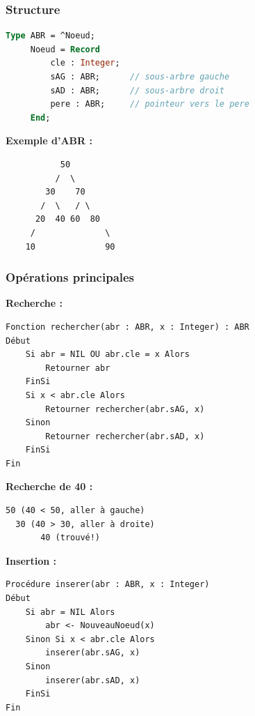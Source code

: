 \documentclass[12pt,a4paper]{article}
\begin{document}
\subsubsection{Structure}

\begin{lstlisting}[language=Pascal]
Type ABR = ^Noeud;
     Noeud = Record
         cle : Integer;
         sAG : ABR;      // sous-arbre gauche
         sAD : ABR;      // sous-arbre droit
         pere : ABR;     // pointeur vers le pere
     End;
\end{lstlisting}

\begin{exemple}
\textbf{Exemple d'ABR :}
\begin{verbatim}
           50
          /  \
        30    70
       /  \   / \
      20  40 60  80
     /              \
    10              90
\end{verbatim}
\end{exemple}

\subsubsection{Opérations principales}

\begin{algorithme}
\textbf{Recherche :}
\begin{verbatim}
Fonction rechercher(abr : ABR, x : Integer) : ABR
Début
    Si abr = NIL OU abr.cle = x Alors
        Retourner abr
    FinSi
    Si x < abr.cle Alors
        Retourner rechercher(abr.sAG, x)
    Sinon
        Retourner rechercher(abr.sAD, x)
    FinSi
Fin
\end{verbatim}
\end{algorithme}

\begin{exemple}
\textbf{Recherche de 40 :}
\begin{verbatim}
50 (40 < 50, aller à gauche)
  30 (40 > 30, aller à droite)
       40 (trouvé!)
\end{verbatim}
\end{exemple}

\begin{algorithme}
\textbf{Insertion :}
\begin{verbatim}
Procédure inserer(abr : ABR, x : Integer)
Début
    Si abr = NIL Alors
        abr <- NouveauNoeud(x)
    Sinon Si x < abr.cle Alors
        inserer(abr.sAG, x)
    Sinon
        inserer(abr.sAD, x)
    FinSi
Fin
\end{verbatim}
\end{algorithme}
\end{document}
